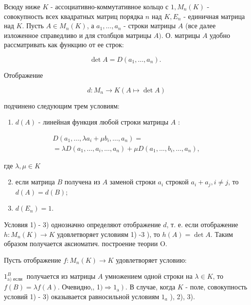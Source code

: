 \documentclass[10pt]{article}
\begin{document}
Всюду ниже $K$ - ассоциативно-коммутативное кольцо с $1, M_{n}(K)$ - совокупность всех квадратных матриц порядка $n$ над $K, E_{n}$ - единичная матрица над $K$. Пусть $A \in M_{n}(K)$, а $a_{1}, \ldots, a_{n}$ - строки матрицы $A$ (все далее изложенное справедливо и для столбцов матрицы $A)$. О. матрицы $A$ удобно рассматривать как функцию от ее строк:

\[
\operatorname{det} A=D\left(a_{1}, \ldots, a_{n}\right) \text {. }
\]

Отображение

\[
d: M_{n} \longrightarrow K(A \longmapsto \operatorname{det} A)
\]

подчинено следующим трем условиям:

\begin{enumerate}
  \item $d(A)$ - линейная функция любой строки матрицы $A$ :
\end{enumerate}

\[
\begin{gathered}
D\left(a_{1}, \ldots, \lambda a_{i}+\mu b_{i}, \ldots, a_{n}\right)= \\
=\lambda D\left(a_{1}, \ldots, a_{i}, \ldots, a_{n}\right)+\mu D\left(a_{1}, \ldots, b_{i}, \ldots, a_{n}\right),
\end{gathered}
\]

где $\lambda, \mu \in K$

\begin{enumerate}
  \setcounter{enumi}{1}
  \item если матрица $B$ получена из $A$ заменой строки $a_{i}$ строкой $a_{i}+a_{j}, i \neq j$, то $d(A)=d(B)$;

  \item $d\left(E_{n}\right)=1$.

\end{enumerate}

Условия 1) - 3) однозначно определяют отображение $d$, т. е. если отображение $h: M_{n}(K) \rightarrow K$ удовлетворяет условиям 1) -3 ), то $h(A)=\operatorname{det} A$. Таким образом получается аксиоматич. построение теории $\mathrm{O}$.

Пусть отображение $f: M_{n}(K) \rightarrow K$ удовлетворяет условию:

$1_{\text {a) если }}^{B}$ получается из матрицы $A$ умножением одноӥ строки на $\lambda \in K$, то $f(B)=\lambda f(A)$. Очевидно,, 1$\left.) \Rightarrow 1_{\mathrm{a}}\right)$. В случае, когда $K$ - поле, совокупность условий 1) - 3) оказывается равносильной условиям $1_{a}$ ), 2), 3).
\end{document}
